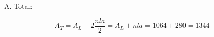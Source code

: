 \documentclass[12pt,addpoints,answers]{evalua}
\begin{document}
\begin{questions}
{\begin{parts}
\begin{minipage}{.75\linewidth}
				A. Total:\\[-2em]
				\begin{solutionbox}{1.5cm}
					\[A_T=A_L+2\dfrac{nla}{2}=A_L+nla=1064+280=1344\]
				\end{solutionbox}
			\end{minipage}
		\end{parts}
	}










\end{questions}
\end{document}
